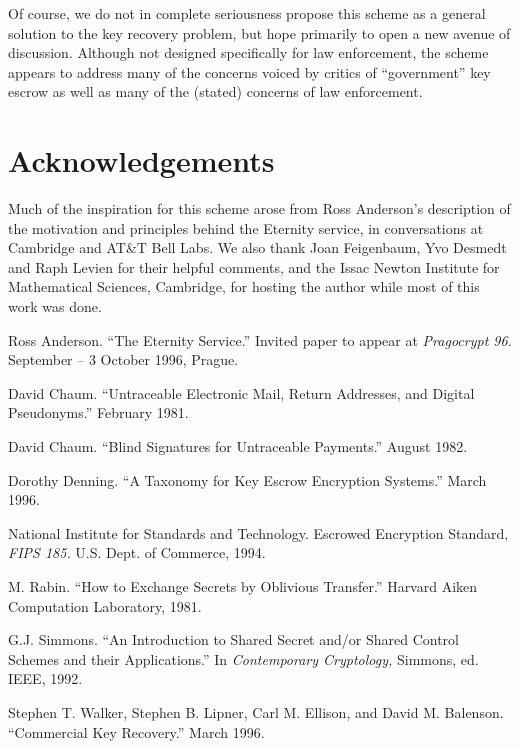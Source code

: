 Of course, we do not in complete seriousness propose this scheme as a
general solution to the key recovery problem, but hope primarily to
open a new avenue of discussion.  Although not designed specifically
for law enforcement, the scheme appears to address many of the
concerns voiced by critics of ``government'' key escrow as well as
many of the (stated) concerns of law enforcement.

\section{Acknowledgements}

Much of the inspiration for this scheme arose from Ross Anderson's
description of the motivation and principles behind the Eternity
service, in conversations at Cambridge and AT\&T Bell Labs.  We also
thank Joan Feigenbaum, Yvo Desmedt and Raph Levien for their helpful
comments, and the Issac Newton Institute for Mathematical Sciences,
Cambridge, for hosting the author while most of this work was done.

\begin{thebibliography}{MMMM00}

\newblock Ross Anderson.
\newblock ``The Eternity Service.''
\newblock Invited paper to appear at {\em Pragocrypt 96.}
 September -- 3 October 1996, Prague.

\newblock David Chaum.
\newblock ``Untraceable Electronic Mail, Return Addresses, and
Digital Pseudonyms.''
 February 1981.

\newblock David Chaum.
\newblock ``Blind Signatures for Untraceable Payments.''
  August 1982.

\newblock Dorothy Denning.
\newblock ``A Taxonomy for Key Escrow Encryption Systems.''
  March 1996.

\newblock National Institute for Standards and Technology.
\newblock Escrowed Encryption Standard, {\em FIPS 185.}
U.S. Dept. of Commerce, 1994.

\newblock M. Rabin.
\newblock ``How to Exchange Secrets by Oblivious Transfer.''
 Harvard Aiken Computation Laboratory, 1981.

\newblock G.J. Simmons.
\newblock ``An Introduction to Shared Secret and/or Shared Control
Schemes and their Applications.''
\newblock In {\em Contemporary Cryptology,} Simmons, ed. IEEE, 1992.

\newblock Stephen T. Walker, Stephen B. Lipner, Carl M. Ellison, and
David M. Balenson.
\newblock ``Commercial Key Recovery.''
  March 1996.

\end{thebibliography}

